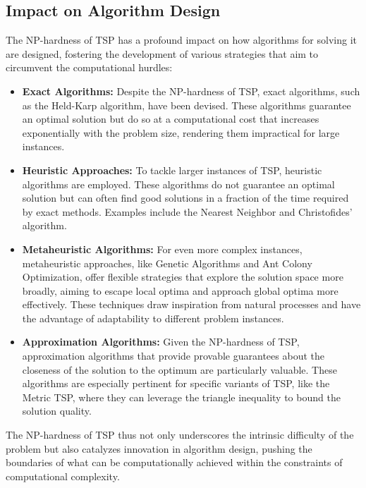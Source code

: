 \subsection{Impact on Algorithm Design}

The NP-hardness of TSP has a profound impact on how algorithms for solving it are designed, fostering the development of various strategies that aim to circumvent the computational hurdles:

\begin{itemize}
	\item \textbf{Exact Algorithms:} Despite the NP-hardness of TSP, exact algorithms, such as the Held-Karp algorithm, have been devised. These algorithms guarantee an optimal solution but do so at a computational cost that increases exponentially with the problem size, rendering them impractical for large instances.
	\item \textbf{Heuristic Approaches:} To tackle larger instances of TSP, heuristic algorithms are employed. These algorithms do not guarantee an optimal solution but can often find good solutions in a fraction of the time required by exact methods. Examples include the Nearest Neighbor and Christofides' algorithm.
	\item \textbf{Metaheuristic Algorithms:} For even more complex instances, metaheuristic approaches, like Genetic Algorithms and Ant Colony Optimization, offer flexible strategies that explore the solution space more broadly, aiming to escape local optima and approach global optima more effectively. These techniques draw inspiration from natural processes and have the advantage of adaptability to different problem instances.
	\item \textbf{Approximation Algorithms:} Given the NP-hardness of TSP, approximation algorithms that provide provable guarantees about the closeness of the solution to the optimum are particularly valuable. These algorithms are especially pertinent for specific variants of TSP, like the Metric TSP, where they can leverage the triangle inequality to bound the solution quality.
\end{itemize}

The NP-hardness of TSP thus not only underscores the intrinsic difficulty of the problem but also catalyzes innovation in algorithm design, pushing the boundaries of what can be computationally achieved within the constraints of computational complexity.


